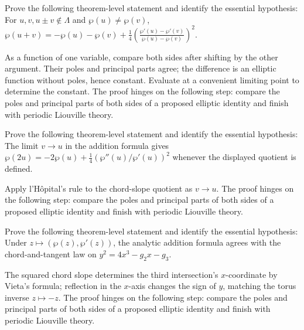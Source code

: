 \begin{problem}\label{prob:iv30-problem-09}
Prove the following theorem-level statement and identify the essential hypothesis: For $u,v,u\pm v\notin\Lambda$ and $\wp(u)\ne\wp(v)$, $\wp(u+v)=-\wp(u)-\wp(v)+\frac14\left(\frac{\wp'(u)-\wp'(v)}{\wp(u)-\wp(v)}\right)^2$.
\end{problem}
\begin{solution}
As a function of one variable, compare both sides after shifting by the other argument. Their poles and principal parts agree; the difference is an elliptic function without poles, hence constant. Evaluate at a convenient limiting point to determine the constant. The proof hinges on the following step: compare the poles and principal parts of both sides of a proposed elliptic identity and finish with periodic Liouville theory.
\end{solution}

\begin{problem}\label{prob:iv30-problem-10}
Prove the following theorem-level statement and identify the essential hypothesis: The limit $v\to u$ in the addition formula gives $\wp(2u)=-2\wp(u)+\frac14(\wp''(u)/\wp'(u))^2$ whenever the displayed quotient is defined.
\end{problem}
\begin{solution}
Apply l'Hôpital's rule to the chord-slope quotient as $v\to u$. The proof hinges on the following step: compare the poles and principal parts of both sides of a proposed elliptic identity and finish with periodic Liouville theory.
\end{solution}

\begin{problem}\label{prob:iv30-problem-11}
Prove the following theorem-level statement and identify the essential hypothesis: Under $z\mapsto(\wp(z),\wp'(z))$, the analytic addition formula agrees with the chord-and-tangent law on $y^2=4x^3-g_2x-g_3$.
\end{problem}
\begin{solution}
The squared chord slope determines the third intersection's $x$-coordinate by Vieta's formula; reflection in the $x$-axis changes the sign of $y$, matching the torus inverse $z\mapsto-z$. The proof hinges on the following step: compare the poles and principal parts of both sides of a proposed elliptic identity and finish with periodic Liouville theory.
\end{solution}

